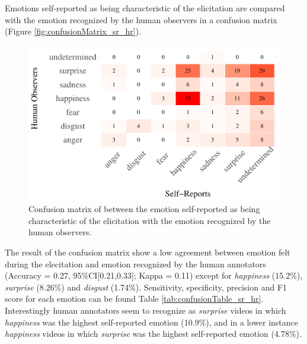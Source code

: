\documentclass[conference,final,]{IEEEtran}
\makeatletter
\def\maxwidth{\ifdim\Gin@nat@width>\linewidth\linewidth
\else\Gin@nat@width\fi}
\let\Oldincludegraphics\includegraphics
\renewcommand{\includegraphics}[1]{\Oldincludegraphics[width=\maxwidth]{#1}}
\makeatother
\begin{document}
Emotions self-reported as being characteristic of the elicitation are
compared with the emotion recognized by the human observers in a
confusion matrix (Figure \ref{fig:confusionMatrix_sr_hr}).

\begin{figure}
\centering
\includegraphics{ACII_2019_paper_files/figure-latex/confusionMatrix_sr_hr-1.pdf}
\caption{Confusion matrix of between the emotion self-reported as being
characteristic of the elicitation with the emotion recognized by the
human observers.}
\end{figure}

The result of the confusion matrix show a low agreement between emotion
felt during the elecitation and emotion recognized by the human
annotators (Accuracy = 0.27, 95\%CI{[}0.21,0.33{]}; Kappa = 0.11) except
for \emph{happiness} (15.2\%), \emph{surprise} (8.26\%) and
\emph{disgust} (1.74\%). Sensitivity, specificity, precision and F1
score for each emotion can be found Table
\ref{tab:confusionTable_sr_hr}. Interestingly human annotators seem to
recognize as \emph{surprise} videos in which \emph{happiness} was the
highest self-reported emotion (10.9\%), and in a lower instance
\emph{happiness} videos in which \emph{surprise} was the highest
self-reported emotion (4.78\%).
\end{document}
